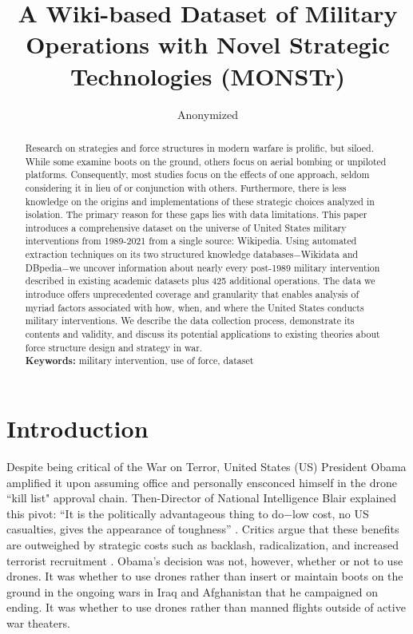 \documentclass[fleqn,12pt]{article}
\title{\singlespacing A Wiki-based Dataset of Military Operations with Novel Strategic Technologies (MONSTr)}
\author{Anonymized}
\date{}
\begin{document}
	\maketitle
	\thispagestyle{empty}
	\setcounter{page}{0}
	
	\begin{abstract}
            \singlespacing \noindent Research on strategies and force structures in modern warfare is prolific, but siloed. While some examine boots on the ground, others focus on aerial bombing or unpiloted platforms. Consequently, most studies focus on the effects of one approach, seldom considering it in lieu of or conjunction with others. Furthermore, there is less knowledge on the origins and implementations of these strategic choices analyzed in isolation. The primary reason for these gaps lies with data limitations. This paper introduces a comprehensive dataset on the universe of United States military interventions from 1989-2021 from a single source: Wikipedia. Using automated extraction techniques on its two structured knowledge databases$-$Wikidata and DBpedia$-$we uncover information about nearly every post-1989 military intervention described in existing academic datasets plus 425 additional operations. The data we introduce offers unprecedented coverage and granularity that enables analysis of myriad factors associated with how, when, and where the United States conducts military interventions. We describe the data collection process, demonstrate its contents and validity, and discuss its potential applications to existing theories about force structure design and strategy in war.\\
		\vspace{.1in}
		\noindent
		\textbf{Keywords:} military intervention, use of force, dataset
	\end{abstract}
	
\newpage
\noindent

\section*{Introduction}
Despite being critical of the War on Terror, United States (US) President Obama amplified it upon assuming office and personally ensconced himself in the drone ``kill list" approval chain. Then-Director of National Intelligence Blair explained this pivot: ``It is the politically advantageous thing to do$-$low cost, no US casualties, gives the appearance of toughness” \citep{BeckerShane12}. Critics argue that these benefits are outweighed by strategic costs such as backlash, radicalization, and increased terrorist recruitment \citep{KilcullenExum09}. Obama's decision was not, however, whether or not to use drones. It was whether to use drones rather than insert or maintain boots on the ground in the ongoing wars in Iraq and Afghanistan that he campaigned on ending. It was whether to use drones rather than manned flights outside of active war theaters.
	
\end{document}
